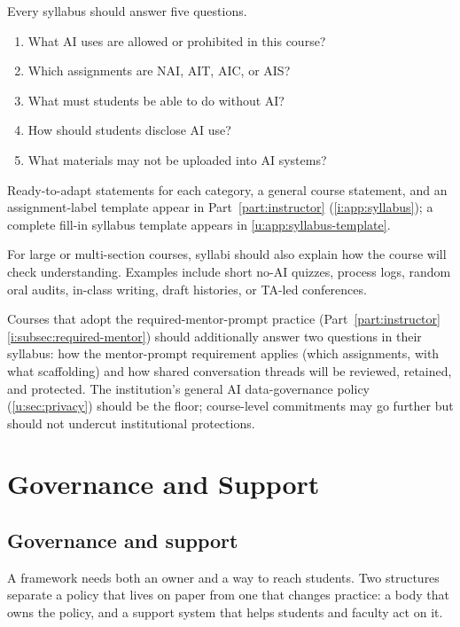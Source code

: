 \documentclass{SIAMbook2023}
\begin{document}
Every syllabus should answer five questions.

\begin{enumerate}
  \item What AI uses are allowed or prohibited in this course?
  \item Which assignments are NAI, AIT, AIC, or AIS?
  \item What must students be able to do without AI?
  \item How should students disclose AI use?
  \item What materials may not be uploaded into AI systems?
\end{enumerate}

Ready-to-adapt statements for each category, a general course statement, and an assignment-label template appear in Part~\ref{part:instructor} (\cref{i:app:syllabus}); a complete fill-in syllabus template appears in \cref{u:app:syllabus-template}.

For large or multi-section courses, syllabi should also explain how the course will check understanding. Examples include short no-AI quizzes, process logs, random oral audits, in-class writing, draft histories, or TA-led conferences.

Courses that adopt the required-mentor-prompt practice (Part~\ref{part:instructor} \cref{i:subsec:required-mentor}) should additionally answer two questions in their syllabus: how the mentor-prompt requirement applies (which assignments, with what scaffolding) and how shared conversation threads will be reviewed, retained, and protected. The institution's general AI data-governance policy (\cref{u:sec:privacy}) should be the floor; course-level commitments may go further but should not undercut institutional protections.

\chapter{Governance and Support}
\label{u:ch:governance-and-support}%

\section{Governance and support}
\label{u:sec:governance-support}%

A framework needs both an owner and a way to reach students. Two structures separate a policy that lives on paper from one that changes practice: a body that owns the policy, and a support system that helps students and faculty act on it.
\end{document}
